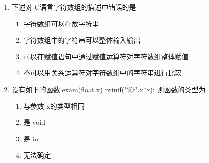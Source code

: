 \documentclass[12pt,a4paper]{article}
\begin{document}
\begin{enumerate}
    \item 下述对 C语言字符数组的描述中错误的是
    \begin{enumerate}
        \item[A)] 字符数组可以存放字符串
        \item[B)] 字符数组中的字符串可以整体输入输出
        \item[C)] 可以在赋值语句中通过赋值运算符对字符数组整体赋值
        \item[D)] 不可以用关系运算符对字符数组中的字符串进行比较
    \end{enumerate}
    
    \item 设有如下的函数 exam(float x){ printf("\%f",x*x); } 则函数的类型为
    \begin{enumerate}
        \item[A)] 与参数 x的类型相同
        \item[B)] 是 void
        \item[C)] 是 int
        \item[D)] 无法确定
    \end{enumerate}
\end{enumerate}
\end{document}
